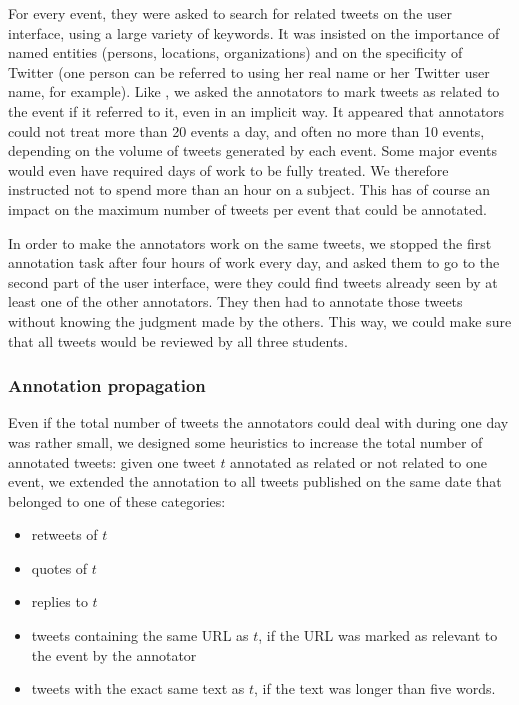 For every event, they were asked to search for related tweets on the user interface, using a large variety of keywords. It was insisted on the importance of named entities (persons, locations, organizations) and on the specificity of Twitter (one person can be referred to using her real name or her Twitter user name, for example). Like \citet{mcminn_building_2013}, we asked the annotators to mark tweets as related to the event if it referred to it, even in an implicit way. It appeared that annotators could not treat more than 20 events a day, and often no more than 10 events, depending on the volume of tweets generated by each event. Some major events would even have required days of work to be fully treated. We therefore instructed not to spend more than an hour on a subject. This has of course an impact on the maximum number of tweets per event that could be annotated. 


In order to make the annotators work on the same tweets, we stopped the first annotation task after four hours of work every day, and asked them to go to the second part of the user interface, were they could find tweets already seen by at least one of the other annotators. They then had to annotate those tweets without knowing the judgment made by the others. This way, we could make sure that all tweets would be reviewed by all three students.
	
		\subsubsection{Annotation propagation \label{Subsec: propagation}}

Even if the total number of tweets the annotators could deal with during one day was rather small, we designed some heuristics to increase the total number of annotated tweets: given one tweet $t$ annotated as related or not related to one event, we extended the annotation to all tweets published on the same date that belonged to one of these categories:
\begin{itemize}
\item retweets of $t$
\item quotes of $t$
\item replies to $t$
\item tweets containing the same URL as $t$, if the URL was marked as relevant to the event by the annotator
\item tweets with the exact same text as $t$, if the text was longer than five words.
\end{itemize}

